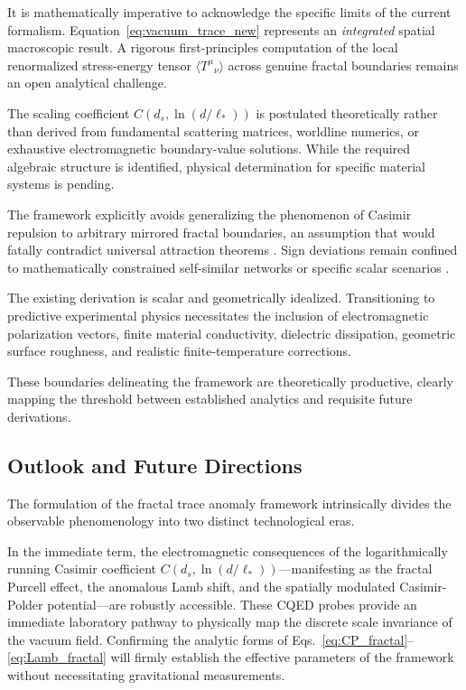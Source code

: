 \documentclass[12pt,letterpaper]{article}
\begin{document}
It is mathematically imperative to acknowledge the specific limits of the current formalism.
Equation~\eqref{eq:vacuum_trace_new} represents an \emph{integrated} spatial macroscopic result. A rigorous first-principles computation of the local renormalized stress-energy tensor $\langle T^\mu{}_{\nu}\rangle$ across genuine fractal boundaries remains an open analytical challenge.

The scaling coefficient $C(d_s,\ln(d/\ell_*))$ is postulated theoretically rather than derived from fundamental scattering matrices, worldline numerics, or exhaustive electromagnetic boundary-value solutions.
While the required algebraic structure is identified, physical determination for specific material systems is pending.

The framework explicitly avoids generalizing the phenomenon of Casimir repulsion to arbitrary mirrored fractal boundaries, an assumption that would fatally contradict universal attraction theorems \cite{kennethklich2006}.
Sign deviations remain confined to mathematically constrained self-similar networks or specific scalar scenarios \cite{shajesh2016}.

The existing derivation is scalar and geometrically idealized. Transitioning to predictive experimental physics necessitates the inclusion of electromagnetic polarization vectors, finite material conductivity, dielectric dissipation, geometric surface roughness, and realistic finite-temperature corrections.

These boundaries delineating the framework are theoretically productive, clearly mapping the threshold between established analytics and requisite future derivations.

\subsection{Outlook and Future Directions}

The formulation of the fractal trace anomaly framework intrinsically divides the observable phenomenology into two distinct technological eras. 

In the immediate term, the electromagnetic consequences of the logarithmically running Casimir coefficient $C(d_s,\ln(d/\ell_*))$---manifesting as the fractal Purcell effect, the anomalous Lamb shift, and the spatially modulated Casimir-Polder potential---are robustly accessible. These CQED probes provide an immediate laboratory pathway to physically map the discrete scale invariance of the vacuum field. Confirming the analytic forms of Eqs.~\eqref{eq:CP_fractal}--\eqref{eq:Lamb_fractal} will firmly establish the effective parameters of the framework without necessitating gravitational measurements.
\end{document}

